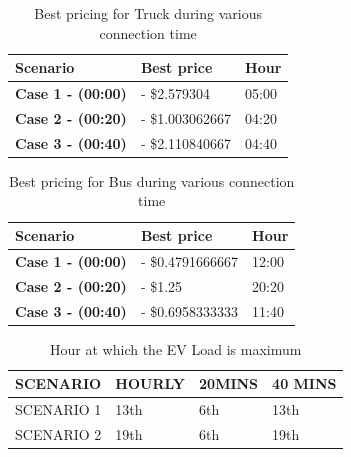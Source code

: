 		\begin{table}[h]
			\centering
			\begin{tabular}{|l|l|l|}
				\hline
				\textbf{Scenario}         & \textbf{Best price} & \textbf{Hour} \\ \hline
				\textbf{Case 1 - (00:00)}  & - \$2.579304 & 05:00         \\ \hline
				\textbf{Case 2 - (00:20)} & - \$1.003062667 & 04:20         \\ \hline
				\textbf{Case 3 - (00:40)} & - \$2.110840667 & 04:40         \\ \hline
			\end{tabular}
			\caption{Best pricing for Truck during various connection time}
		\end{table}



		\begin{table}[h]
			\centering
			\begin{tabular}{|l|l|l|}
				\hline
				\textbf{Scenario}         & \textbf{Best price} & \textbf{Hour} \\ \hline
				\textbf{Case 1 - (00:00)}  & - \$0.4791666667   & 12:00         \\ \hline
				\textbf{Case 2 - (00:20)} & - \$1.25         & 20:20         \\ \hline
				\textbf{Case 3 - (00:40)} & - \$0.6958333333 & 11:40         \\ \hline
			\end{tabular}
			\caption{Best pricing for Bus during various connection time}
		\end{table}
	
	\begin{table}[h]
		\centering
		\begin{tabular}{|ll|ll|ll|ll|}
			\hline
			\multicolumn{2}{|l|}{\textbf{SCENARIO}} & \multicolumn{2}{l|}{\textbf{HOURLY}} & \multicolumn{2}{l|}{\textbf{20MINS}} & \multicolumn{2}{l|}{\textbf{40 MINS}} \\ \hline
			\multicolumn{2}{|l|}{SCENARIO 1}        & \multicolumn{2}{l|}{13th}            & \multicolumn{2}{l|}{6th}             & \multicolumn{2}{l|}{13th}             \\ \hline
			\multicolumn{2}{|l|}{SCENARIO 2}        & \multicolumn{2}{l|}{19th}            & \multicolumn{2}{l|}{6th}             & \multicolumn{2}{l|}{19th}             \\ \hline
		\end{tabular}
		\caption{Hour at which the EV Load is maximum }
	\end{table}
		
